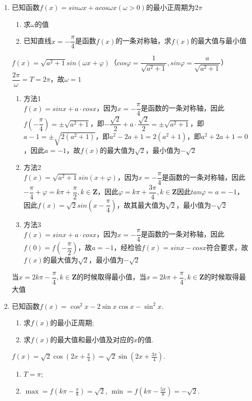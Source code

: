 \begin{enumerate}
\item 已知函数$f(x) = sin\omega x+acos\omega x (\omega > 0)$的最小正周期为$2\pi$
\begin{enumerate}
    \item 求$\omega$的值
    \item 已知直线$x = -\dfrac{\pi}{4}$是函数$f(x)$的一条对称轴，求$f(x)$的最大值与最小值
\end{enumerate}
\begin{jieda}
    $f(x) = \sqrt{a^2+1}sin(\omega x + \varphi)$（$cos\varphi = \dfrac{1}{\sqrt{a^2+1}}, sin\varphi = \dfrac{a}{\sqrt{a^2+1}}$）$\dfrac{2\pi}{\omega} = T = 2\pi$，故$\omega = 1$
    \begin{enumerate}
        \item 方法1 \\
         $f(x) = sinx + a \cdot cosx$，因为$x = -\dfrac{\pi}{4}$是函数的一条对称轴，因此$f(-\dfrac{\pi}{4}) = \pm \sqrt{a^2+1}$，即$-\dfrac{\sqrt{2}}{2} + a \cdot \dfrac{\sqrt{2}}{2} = \pm \sqrt{a^2+1}$，即$a-1 = \pm \sqrt{2(a^2+1)}$，即$a^2-2a+1 = 2(a^2+1)$，即$a^2+2a+1 = 0$，因此$a = -1$，故$f(x)$的最大值为$\sqrt{2}$，最小值为$-\sqrt{2}$
        \item 方法2 \\
        $f(x) = \sqrt{a^2+1} sin(x+\varphi)$，因为$x = -\dfrac{\pi}{4}$是函数的一条对称轴，因此$-\dfrac{\pi}{4} + \varphi = k\pi + \dfrac{\pi}{2}, k \in \mathbf{Z}$，因此$\varphi = k\pi + \dfrac{3\pi}{4}, k \in \mathbf{Z}$因此$tan\varphi = a = -1$，因此$f(x) = \sqrt{2}sin(x - \dfrac{\pi}{4})$，故其最大值为$\sqrt{2}$，最小值为$-\sqrt{2}$
        \item 方法3 \\
        $f(x) = sinx + a \cdot cosx$，因为$x = -\dfrac{\pi}{4}$是函数的一条对称轴，因此$f(0) = f(-\dfrac{\pi}{2})$，故$a = -1$，经检验$f(x) = sinx - cosx$符合要求，故$f(x)$的最大值为$\sqrt{2}$，最小值为$-\sqrt{2}$
    \end{enumerate}
    当$x = 2k\pi - \dfrac{\pi}{4}, k \in \mathbf{Z}$的时候取得最小值，当$x = 2k\pi + \dfrac{\pi}{4}, k \in \mathbf{Z}$的时候取得最大值
\end{jieda}

\item 已知函数$f(x)=\cos^2x-2\sin{x}\cos{x}-\sin^2x$. 
\begin{enumerate}[(1)]
\item 求$f(x)$的最小正周期;
\item 求$f(x)$的最大值和最小值及对应的$x$的值.
\end{enumerate}
\begin{jieda}
$f(x)=\sqrt{2}\cos(2x+\frac{\pi}{4})=\sqrt{2}\sin(2x+\frac{3\pi}{4})$. 
\begin{enumerate}[(1)]
\item $T=\pi$; 
\item $\max=f(k\pi-\frac{\pi}{8})=\sqrt{2}$, $\min=f(k\pi-\frac{5\pi}{8})=-\sqrt{2}$. 
\end{enumerate}
\end{jieda}



\end{enumerate}
